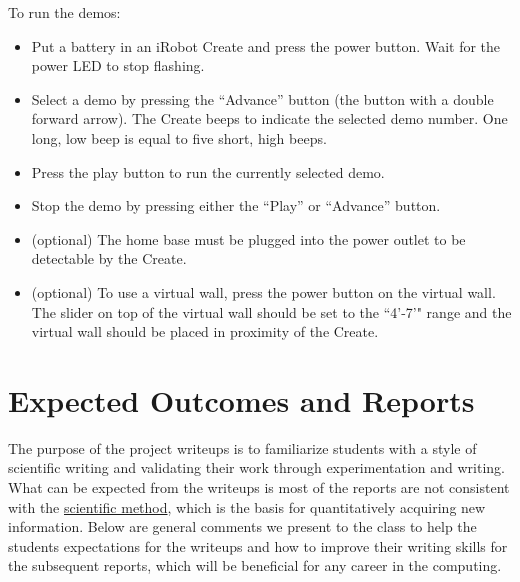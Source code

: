 To run the demos:
\begin{itemize}
\item Put a battery in an iRobot Create and press the power button. Wait for the power LED to stop flashing.
\item Select a demo by pressing the ``Advance'' button (the button with a double forward arrow). The Create beeps to indicate the selected demo number. One long, low beep is equal to five short, high beeps. 
\item Press the play button to run the currently selected demo. 
\item Stop the demo by pressing either the ``Play'' or ``Advance'' button.
\item (optional) The home base must be plugged into the power outlet to be detectable by the Create.
\item (optional) To use a virtual wall, press the power button on the virtual wall. The slider on top of the virtual wall should be set to the ``4'-7'" range and the virtual wall should be placed in proximity of the Create.
\end{itemize}

\section{Expected Outcomes and Reports}

The purpose of the project writeups is to familiarize students with a style of scientific writing and validating their work through experimentation and writing.  What can be expected from the writeups is most of the reports are not consistent with the \href{http://en.wikipedia.org/wiki/Scientific_method}{scientific method}, which is the basis for quantitatively acquiring new information.  Below are general comments we present to the class to help the students expectations for the writeups and how to improve their writing skills for the subsequent reports, which will be beneficial for any career in the computing. 


